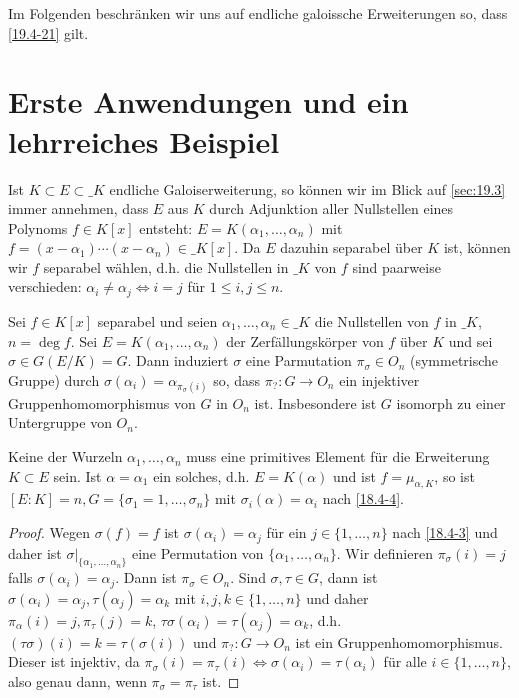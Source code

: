 Im Folgenden beschränken wir uns auf endliche galoissche Erweiterungen so, dass \ref{19.4-21} gilt.


\section{Erste Anwendungen und ein lehrreiches Beispiel}


Ist $K \subset E \subset \_K$ endliche Galoiserweiterung, so können wir im Blick auf \ref{sec:19.3} immer annehmen, dass $E$ aus $K$ durch Adjunktion aller Nullstellen eines Polynoms $f \in K[x]$ entsteht: $E = K(\alpha_1, \dotsc, \alpha_n)$ mit $f = (x-\alpha_1) \dotsb (x-\alpha_n) \in \_K[x]$.
Da $E$ dazuhin separabel über $K$ ist, können wir $f$ separabel wählen, d.h. die Nullstellen in $\_K$ von $f$ sind paarweise verschieden: $\alpha_i \neq \alpha_j \iff i = j$ für $1 \le i,j \le n$.

\begin{st} \label{19.5-1}
	Sei $f \in K[x]$ separabel und seien $\alpha_1, \dotsc, \alpha_n \in \_K$ die Nullstellen von $f$ in $\_K$, $n = \deg f$.
	Sei $E = K(\alpha_1, \dotsc, \alpha_n)$ der Zerfällungskörper von $f$ über $K$ und sei $\sigma \in G(E / K) = G$.
	Dann induziert $\sigma$ eine Parmutation $\pi_\sigma \in O_n$ (symmetrische Gruppe) durch $\sigma(\alpha_i) = \alpha_{\pi_\sigma(i)}$ so, dass $\pi_?: G \to O_n$ ein injektiver Gruppenhomomorphismus von $G$ in $O_n$ ist.
	Insbesondere ist $G$ isomorph zu einer Untergruppe von $O_n$.
	\begin{note}
		Keine der Wurzeln $\alpha_1, \dotsc, \alpha_n$ muss eine primitives Element für die Erweiterung $K \subset E$ sein.
		Ist $\alpha = \alpha_1$ ein solches, d.h. $E = K(\alpha)$ und ist $f = \mu_{\alpha, K}$, so ist $[E : K] = n, G = \{ \sigma_1 = 1, \dotsc, \sigma_n \}$ mit $\sigma_i(\alpha) = \alpha_i$ nach \ref{18.4-4}.
	\end{note}
	\begin{proof}
		Wegen $\sigma(f) = f$ ist $\sigma(\alpha_i) = \alpha_j $ für ein $j \in \{1, \dotsc, n\}$ nach \ref{18.4-3} und daher ist $\sigma|_{\{\alpha_1, \dotsc, \alpha_n\}}$ eine Permutation von $\{\alpha_1, \dotsc, \alpha_n\}$.
		Wir definieren $\pi_\sigma(i) = j$ falls $\sigma(\alpha_i) = \alpha_j$.
		Dann ist $\pi_\sigma \in O_n$.
		Sind $\sigma, \tau \in G$, dann ist $\sigma(\alpha_i) = \alpha_j, \tau(\alpha_j) = \alpha_k$ mit $i,j,k \in \{1, \dotsc, n\}$ und daher $\pi_\alpha(i) = j, \pi_\tau(j) = k$, $\tau \sigma(\alpha_i) = \tau(\alpha_j) = \alpha_k$, d.h. $(\tau\sigma)(i) = k = \tau(\sigma(i))$ und $\pi_?: G \to O_n$ ist ein Gruppenhomomorphismus.
		Dieser ist injektiv, da $\pi_\sigma(i) = \pi_\tau(i) \iff \sigma(\alpha_i) = \tau(\alpha_i)$ für alle $i \in \{1, \dotsc, n\}$, also genau dann, wenn $\pi_\sigma = \pi_\tau$ ist.
	\end{proof}
\end{st}

